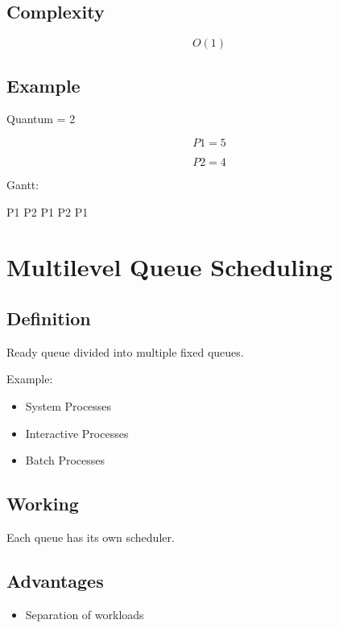 \subsection{Complexity}

\[
O(1)
\]

\subsection{Example}

Quantum = 2

\[
P1=5
\]

\[
P2=4
\]

Gantt:

\begin{center}
P1 P2 P1 P2 P1
\end{center}

\section{Multilevel Queue Scheduling}

\subsection{Definition}

Ready queue divided into multiple fixed queues.

Example:

\begin{itemize}
\item System Processes
\item Interactive Processes
\item Batch Processes
\end{itemize}

\subsection{Working}

Each queue has its own scheduler.

\subsection{Advantages}

\begin{itemize}
\item Separation of workloads
\end{itemize}

